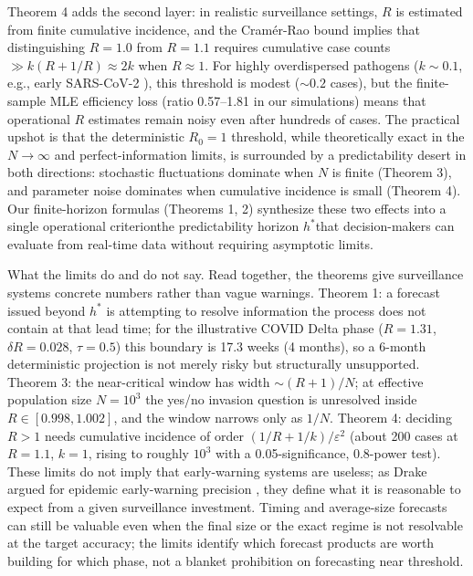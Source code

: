 \documentclass[review]{elsarticle}
\theoremstyle{plain}
\theoremstyle{definition}
\begin{document}
Theorem 4 adds the second layer: in realistic surveillance settings, $R$ is estimated from finite cumulative incidence, and the Cramér-Rao bound implies that distinguishing $R = 1.0$ from $R = 1.1$ requires cumulative case counts $\gg k(R + 1/R) \approx 2k$ when $R \approx 1$. For highly overdispersed pathogens ($k \sim 0.1$, e.g., early SARS-CoV-2 \citep{endo2020overdispersion, adam2020clustering}), this threshold is modest ($\sim 0.2$ cases), but the finite-sample MLE efficiency loss (ratio 0.57--1.81 in our simulations) means that operational $R$ estimates remain noisy even after hundreds of cases. The practical upshot is that the deterministic $R_0 = 1$ threshold, while theoretically exact in the $N \to \infty$ and perfect-information limits, is surrounded by a predictability desert in both directions: stochastic fluctuations dominate when $N$ is finite (Theorem 3), and parameter noise dominates when cumulative incidence is small (Theorem 4). Our finite-horizon formulas (Theorems 1, 2) synthesize these two effects into a single operational criterion\textemdash the predictability horizon $h^*$\textemdash that decision-makers can evaluate from real-time data without requiring asymptotic limits.

What the limits do and do not say. Read together, the theorems give surveillance systems concrete numbers rather than vague warnings. Theorem 1: a forecast issued beyond $h^*$ is attempting to resolve information the process does not contain at that lead time; for the illustrative COVID Delta phase ($R=1.31$, $\delta R=0.028$, $\tau=0.5$) this boundary is 17.3 weeks (4 months), so a 6-month deterministic projection is not merely risky but structurally unsupported. Theorem 3: the near-critical window has width $\sim (R+1)/N$; at effective population size $N=10^3$ the yes/no invasion question is unresolved inside $R \in [0.998, 1.002]$, and the window narrows only as $1/N$. Theorem 4: deciding $R>1$ needs cumulative incidence of order $(1/R+1/k)/\varepsilon^2$ (about 200 cases at $R=1.1$, $k=1$, rising to roughly $10^3$ with a 0.05-significance, 0.8-power test). These limits do not imply that early-warning systems are useless; as Drake argued for epidemic early-warning precision \citep{drake2005fundamental}, they define what it is reasonable to expect from a given surveillance investment. Timing and average-size forecasts can still be valuable even when the final size or the exact regime is not resolvable at the target accuracy; the limits identify which forecast products are worth building for which phase, not a blanket prohibition on forecasting near threshold.
\end{document}

